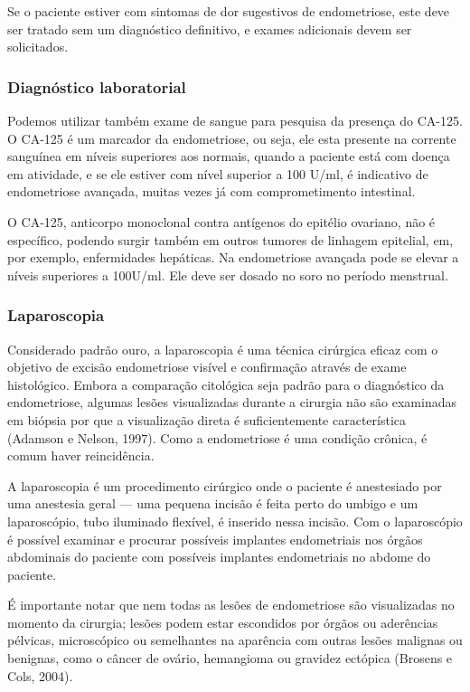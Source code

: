 \documentclass[12pt]{article} %
\begin{document}
Se o paciente estiver com sintomas de dor sugestivos de endometriose,
este deve ser tratado sem um diagnóstico definitivo, e exames
adicionais devem ser solicitados.
 
\subsubsection{Diagnóstico laboratorial}

Podemos utilizar também exame de sangue para pesquisa da presença do
CA-125. O CA-125 é um marcador da endometriose, ou seja, ele esta
presente na corrente sanguínea em níveis superiores aos normais,
quando a paciente está com doença em atividade, e se ele estiver com
nível superior a 100 U/ml, é indicativo de endometriose avançada,
muitas vezes já com comprometimento intestinal.

O CA-125, anticorpo monoclonal contra antígenos do epitélio ovariano,
não é específico, podendo surgir também em outros tumores de linhagem
epitelial, em, por exemplo, enfermidades hepáticas. Na endometriose
avançada pode se elevar a níveis superiores a 100U/ml. Ele deve ser
dosado no soro no período menstrual.

\subsubsection{Laparoscopia}

Considerado padrão ouro, a laparoscopia é uma técnica cirúrgica eficaz
com o objetivo de excisão endometriose visível e confirmação através
de exame histológico. Embora a comparação citológica seja padrão para
o diagnóstico da endometriose, algumas lesões visualizadas durante a
cirurgia não são examinadas em biópsia por que a visualização direta é
suficientemente característica (Adamson e Nelson, 1997). Como a
endometriose é uma condição crônica, é comum haver reincidência.

A laparoscopia é um procedimento cirúrgico onde o paciente é
anestesiado por uma anestesia geral --- uma pequena incisão é feita
perto do umbigo e um laparoscópio, tubo iluminado flexível, é inserido
nessa incisão. Com o laparoscópio é possível examinar e procurar
possíveis implantes endometriais nos órgãos abdominais do paciente com
possíveis implantes endometriais no abdome do paciente.

É importante notar que nem todas as lesões de endometriose são
visualizadas no momento da cirurgia; lesões podem estar escondidos por
órgãos ou aderências pélvicas, microscópico ou semelhantes na
aparência com outras lesões malignas ou benignas, como o câncer de
ovário, hemangioma ou gravidez ectópica (Brosens e Cols, 2004).
\end{document}
